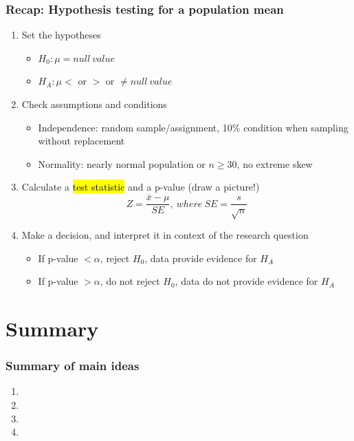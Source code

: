 \documentclass[slidestop,compress,mathserif,12pt,t,professionalfonts,xcolor=table]{beamer}
\begin{document}

\begin{frame}
\frametitle{Recap: Hypothesis testing for a population mean}

\begin{enumerate}

\item Set the hypotheses
\begin{itemize}
\item $H_0: \mu = null~value$
\item $H_A: \mu <$ or $>$ or $\ne null~value$
\end{itemize}

\item Check assumptions and conditions
\begin{itemize}
\item Independence: random sample/assignment, 10\% condition when sampling without replacement
\item Normality: nearly normal population or $n \ge 30$, no extreme skew
\end{itemize}

\item Calculate a \hl{test statistic} and a p-value (draw a picture!)
\[ Z = \frac{\bar{x} - \mu}{SE},~where~SE = \frac{s}{\sqrt{n}} \]

\item Make a decision, and interpret it in context of the research question
\begin{itemize}
\item If p-value $< \alpha$, reject $H_0$, data provide evidence for $H_A$
\item If p-value $> \alpha$, do not reject $H_0$, data do not provide evidence for $H_A$
\end{itemize}

\end{enumerate}

\end{frame}


\section{Summary}


\begin{frame}
\frametitle{Summary of main ideas}

\vfill

\begin{enumerate}

\item {}

\item {}

\item {}

\item {}

\end{enumerate}

\vfill

\end{frame}

\end{document}
